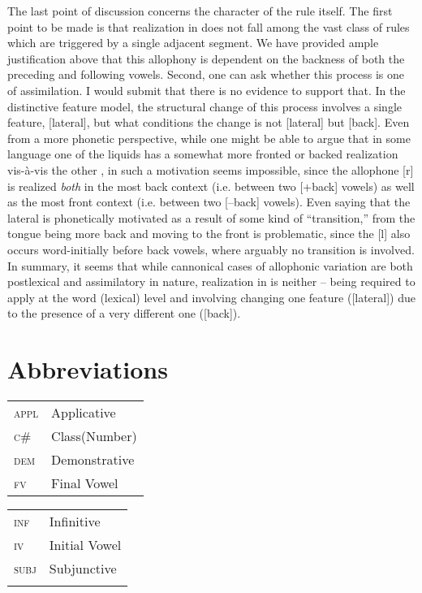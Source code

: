 \documentclass[output=paper,modfonts,nonflat,
colorlinks, citecolor=brown,
draftmode,
]{langsci/langscibook}
\begin{document}
The last point of discussion concerns the character of the rule itself. The first point to be made is that  realization in  does not fall among the vast class of rules which are triggered by a single adjacent segment. We have provided ample justification above that this allophony is dependent on the backness of both the preceding and following vowels. Second, one can ask whether this process is one of assimilation. I would submit that there is no evidence to support that. In the distinctive feature model, the structural change of this process involves a single feature, [lateral], but what conditions the change is not [lateral] but [back]. Even from a more phonetic perspective, while one might be able to argue that in some language one of the liquids has a somewhat more fronted or backed realization vis-à-vis the other , in  such a motivation seems impossible, since the allophone [r] is realized \textit{both} in the most back context (i.e. between two [+back] vowels) as well as the most front context (i.e. between two [--back] vowels). Even saying that the lateral is phonetically motivated as a result of some kind of “transition,” from the tongue being more back and moving to the front is problematic, since the [l] also occurs word-initially before back vowels, where arguably no transition is involved. In summary, it seems that while cannonical cases of allophonic variation are both postlexical and assimilatory in nature,  realization in  is neither -- being required to apply at the word (lexical) level and involving changing one feature ([lateral]) due to the presence of a very different one ([back]).

\section*{Abbreviations}

\begin{tabularx}{.45\textwidth}{lQ}
\textsc{appl} & {Applicative}\\
\textsc{c\#} & {Class(Number)}\\
{\textsc{dem}} & {Demonstrative}\\
{\textsc{fv}} & {Final Vowel}\\
\end{tabularx}
\begin{tabularx}{.45\textwidth}{lQ}
{\textsc{inf}} & {Infinitive}\\
\textsc{iv} & {Initial Vowel}\\
\textsc{subj} & {Subjunctive}\\
\\
\end{tabularx}
 

\sloppy
\printbibliography[heading=subbibliography,notkeyword=this]
\end{document}
